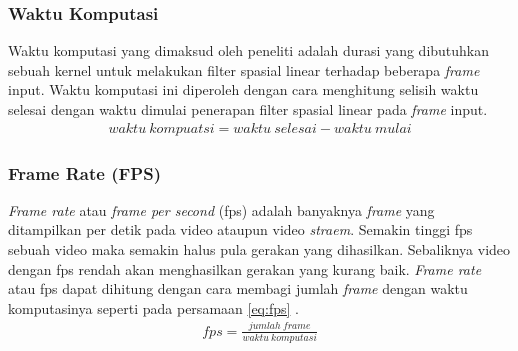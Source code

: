 \subsubsection{Waktu Komputasi}
Waktu komputasi yang dimaksud oleh peneliti adalah durasi yang dibutuhkan sebuah kernel untuk melakukan filter spasial linear terhadap beberapa \textit{frame} input. Waktu komputasi ini diperoleh dengan cara menghitung selisih waktu selesai dengan waktu dimulai penerapan filter spasial linear pada \textit{frame} input.
\begin{equation}
    \label{eq:time}
    \begin{split}
waktu\ kompuatsi = waktu\ selesai - waktu\ mulai
    \end{split}
\end{equation}

\subsubsection{Frame Rate (FPS)}
\textit{Frame rate} atau \textit{frame per second} (fps) adalah banyaknya \textit{frame} yang ditampilkan per detik pada video ataupun video \textit{straem}. Semakin tinggi fps sebuah video maka semakin halus pula gerakan yang dihasilkan. Sebaliknya video dengan fps rendah akan menghasilkan gerakan yang kurang baik. \textit{Frame rate} atau fps dapat dihitung dengan cara membagi jumlah \textit{frame} dengan waktu komputasinya seperti pada persamaan \ref{eq:fps} \cite{pdf:pavan}.
\begin{equation}
    \label{eq:fps}
    \begin{split}
fps = \frac{jumlah\ frame}{waktu\ komputasi}
    \end{split}
\end{equation}

